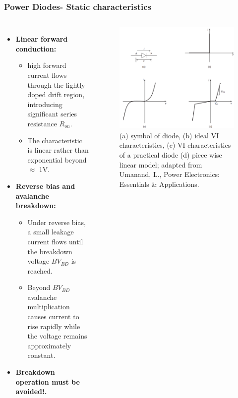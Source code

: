 \begin{frame}
    \frametitle{Power Diodes- Static characteristics}
    \begin{columns}
        \begin{itemize}
            \item \textbf{Linear forward conduction:}
            \begin{itemize}
                \item high forward current flows through the lightly doped drift region, introducing significant series resistance $R_{on}$.
                \item The characteristic is linear rather than exponential beyond $\approx$ 1V.
            \end{itemize}
            \item \textbf{Reverse bias and avalanche breakdown:}
            \begin{itemize}
                \item Under reverse bias, a small leakage current flows until the breakdown voltage $BV_{BD}$ is reached.
                \item Beyond $BV_{BD}$ avalanche multiplication causes current to rise rapidly while the voltage remains approximately constant.
            \end{itemize}
            \item \textbf{Breakdown operation must be avoided!.}
        \end{itemize}

        \begin{figure}
            \centering
            \includegraphics[scale=0.275]{fig/lec04/static_characteristics_diode.png}
            \caption{(a) symbol of diode, (b) ideal VI characteristics, (c) VI characteristics of a practical diode (d) piece wise linear model; adapted from Umanand, L., Power Electronics: Essentials \& Applications.}
            \label{fig:static_diode_characteristics}
        \end{figure}
    \end{columns}
\end{frame}

